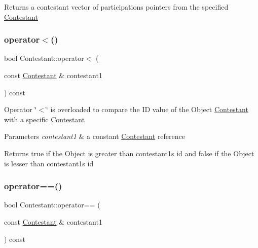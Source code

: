 \begin{DoxyReturn}{Returns}
a contestant vector of participations pointers from the specified \hyperlink{class_contestant}{Contestant} 
\end{DoxyReturn}
\mbox{\label{class_contestant_ae51d0d7eb8a0cf2e70f0cfe92c74e7ae}} 
\subsubsection{\texorpdfstring{operator$<$()}{operator<()}}
{\footnotesize\ttfamily bool Contestant\+::operator$<$ (\begin{DoxyParamCaption}\item[{const \hyperlink{class_contestant}{Contestant} \&}]{contestant1 }\end{DoxyParamCaption}) const}

Operator \char`\"{}$<$\char`\"{} is overloaded to compare the ID value of the Object \hyperlink{class_contestant}{Contestant} with a specific \hyperlink{class_contestant}{Contestant} 
\begin{DoxyParams}{Parameters}
{\em contestant1} & a constant \hyperlink{class_contestant}{Contestant} reference \\
\hline
\end{DoxyParams}
\begin{DoxyReturn}{Returns}
true if the Object is greater than contestant1\textquotesingle{}s id and false if the Object is lesser than contestant1\textquotesingle{}s id 
\end{DoxyReturn}
\mbox{\label{class_contestant_a6d1d627ddf49dc5d3b77a6d42a3680fd}} 
\subsubsection{\texorpdfstring{operator==()}{operator==()}}
{\footnotesize\ttfamily bool Contestant\+::operator== (\begin{DoxyParamCaption}\item[{const \hyperlink{class_contestant}{Contestant} \&}]{contestant1 }\end{DoxyParamCaption}) const}

